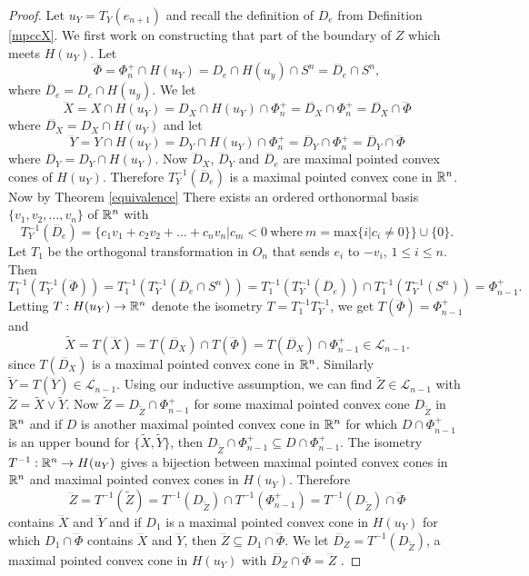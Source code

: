 \documentclass[psamsfonts]{amsart}
\numberwithin{equation}{subsection}
\theoremstyle{plain}
\theoremstyle{definition}
\theoremstyle{remark}
\begin{document}
\begin{proof}
Let $u_Y = T_Y(e_{n + 1})$ and recall the definition of $D_e$ from Definition \ref{mpccX}. We first work on constructing that part of the boundary of $Z$ which meets $H(u_Y)$.
 Let 
 $$\dddot{\Phi} = \Phi_n^+ \cap H(u_Y) = D_e \cap H(u_y) \cap S^{n} = \dddot{D_e}\cap S^{n },$$
 where $\dddot{D_e} = D_e \cap H(u_y)$. We let 
 $$\dddot{X} = X \cap H(u_Y) = D_X \cap H(u_Y) \cap \Phi_n^+ = \dddot{D_X} \cap \Phi_n^+ =  \dddot{D_X} \cap \dddot{\Phi}$$
 where $\dddot{D_X} = D_X \cap H(u_Y)$ and  let 
  $$\dddot{Y} = Y \cap H(u_Y)
=D_Y \cap H(u_Y) \cap \Phi_n^+ =  \dddot{D_Y} \cap \Phi_n^+ =  \dddot{D_Y} \cap \dddot{\Phi}$$
 where $\dddot{D_Y} = D_Y \cap H(u_Y)$.
  Now $\dddot{D}_X$,  $\dddot{D}_Y $ and $\dddot{D_e}$ are  maximal pointed convex cones of $H(u_Y)$.
 Therefore  $T_Y^{-1}(\dddot{D_e})$     is a  maximal pointed convex cone in $\Bbb{R}^n$.  Now by Theorem \ref{equivalence}
 There exists an ordered  orthonormal basis $\{v_1, v_2, \dots , v_n \}$ of $\Bbb{R}^n$ with 
 $$T_Y^{-1}(\dddot{D_e}) = \{c_1v_1 + c_2v_2 + \dots + c_nv_n | c_m < 0 \ \mbox{where} \ m = \mbox{max}\{i | 
c_i \not= 0 \} \} \cup \{0\}.$$ Let $T_1$ be the orthogonal transformation in $O_n$ that sends $e_i$ to $-v_i$, $1 \leq i \leq n$. Then $$T_1^{-1}(T_Y^{-1}(\dddot{\Phi})) = T_1^{-1}(T_Y^{-1}(\dddot{D_e}\cap S^{n })) = T_1^{-1}(T_Y^{-1}(\dddot{D_e}))\cap T_1^{-1}(T_Y^{-1}(S^{n })) = \Phi^+_{n - 1}.$$
 Letting $T :H(u_Y) \to \Bbb{R}^n$ denote the isometry $T = T_1^{-1}T_Y^{-1} $, we get $T(\dddot{\Phi}) = \Phi^+_{n - 1}$ and 
$$
\widetilde{X} = T(\dddot{X})
= T(\dddot{D_X}) \cap T(\dddot{\Phi}) = 
T(\dddot{D_X}) \cap \Phi_{n - 1}^+ \in \mathcal{L}_{n -1}.
$$
since $T(\dddot{D_X})$ is a maximal pointed convex cone in $\Bbb{R}^n$. 
 Similarly $\widetilde{Y} =  T(\dddot{Y}) \in \mathcal{L}_{n -1}$. 
Using our inductive assumption, we can find  $\widetilde{Z} \in \mathcal{L}_{n - 1}$ with $\widetilde{Z} = \widetilde{X}\vee \widetilde{Y}$.  Now $\widetilde{Z} = D_{\widetilde{Z}} \cap \Phi_{n - 1}^+$ for some maximal pointed convex cone $D_{\widetilde{Z}}$ in $\Bbb{R}^n$ and if $D$ is another maximal pointed convex cone in $\Bbb{R}^n$ for which $ D \cap \Phi_{n - 1}^+$ is an upper bound for $\{\widetilde{X}, \widetilde{Y}\}$, then $ D_{\widetilde{Z}} \cap \Phi_{n - 1}^+ \subseteq D \cap \Phi_{n - 1}^+$.  The isometry $T^{-1} : \Bbb{R}^n \to H(u_Y)$ gives a bijection between maximal pointed convex cones in $\Bbb{R}^n$ and maximal pointed convex cones in 
$H(u_Y)$.  Therefore 
$$\dddot{Z} = T^{-1}(\widetilde{Z}) = T^{-1}(D_{\widetilde{Z}}) \cap T^{-1}(\Phi_{n - 1}^+) = T^{-1}(D_{\widetilde{Z}}) \cap \dddot{\Phi}$$
 contains $\dddot{X}$ and $\dddot{Y}$ and if $D_1$ is a maximal pointed convex cone in $H(u_Y)$ for which $D_1 \cap  \dddot{\Phi}$ contains $\dddot{X}$ and $\dddot{Y}$, then $\dddot{Z} \subseteq D_1 \cap  \dddot{\Phi}$. We let 
$\dddot{D_Z} = T^{-1}(D_{\widetilde{Z}})$,  a  maximal pointed convex cone in $H(u_Y)$ with $\dddot{D_Z}  \cap \dddot{\Phi} = \dddot{Z}$ . 


\end{proof}
\end{document}
